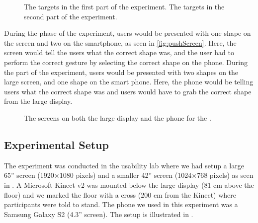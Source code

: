 \begin{figure}[H]
\centering
{}
\hspace{0.05\columnwidth}
\caption{\protect{} The targets in the first part of the experiment. \protect{} The targets in the second part of the experiment.}
\end{figure}

During the \push phase of the experiment, users would be presented with one shape on the screen and two on the smartphone, as seen in \cref{fig:pushScreen}.
Here, the screen would tell the users what the correct shape was, and the user had to perform the correct gesture by selecting the correct shape on the phone.
During the \pull part of the experiment, users would be presented with two shapes on the large screen, and one shape on the smart phone.
Here, the phone would be telling users what the correct shape was and users would have to grab the correct shape from the large display. 

\begin{figure}[H]
	\hspace{0.01\columnwidth}
	\caption{The screens on both the large display and the phone for the \accuracy.}
\end{figure}

\subsection{Experimental Setup} \label{sec:setup}
The experiment was conducted in the usability lab where we had setup a large 65'' screen (1920$\times$1080 pixels) and a smaller 42'' screen (1024$\times$768 pixels) as seen in .
A Microsoft Kinect v2 was mounted below the large display (81 cm above the floor) and we marked the floor with a cross (200 cm from the Kinect) where participants were told to stand.
The phone we used in this experiment was a Samsung Galaxy S2 (4.3'' screen).
The setup is illustrated in .


